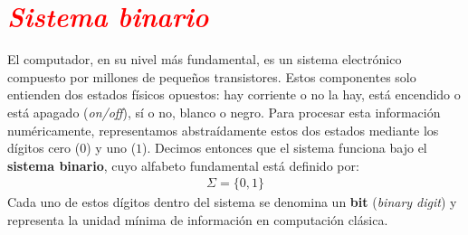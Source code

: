 \documentclass[12pt]{article}
\begin{document}

\section*{\textcolor{red}{\textit{Sistema binario}}}

El computador, en su nivel más fundamental, es un sistema electrónico compuesto 
por millones de pequeños transistores. Estos componentes solo entienden dos estados 
físicos opuestos: hay corriente o no la hay, está encendido o está apagado (\textit{on/off}), 
sí o no, blanco o negro.
Para procesar esta información numéricamente, 
representamos abstraídamente estos dos estados mediante los dígitos 
cero ($0$) y uno ($1$). 
Decimos entonces que el sistema funciona bajo el 
\textbf{sistema binario}, cuyo alfabeto fundamental está definido por:
%
\begin{align*}
\Sigma = \{0, 1\}
\end{align*}
%
Cada uno de estos dígitos dentro del sistema se denomina un 
\textbf{bit} (\textit{binary digit}) y representa la unidad mínima de información en 
computación clásica.
\end{document}
